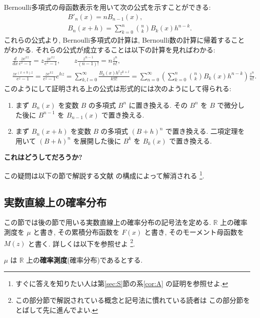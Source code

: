 \documentclass[12pt,twoside]{jarticle}
\newcommand\BF{\bfseries}
\newcommand\R{{\mathbb R}} %
\theoremstyle{jplain}
\theoremstyle{jplain}
\theoremstyle{jplain}
\numberwithin{theorem}{section}
\numberwithin{equation}{section}
\numberwithin{figure}{section}
\numberwithin{table}{section}
\newcommand\secref[1]{第\ref{#1}節}
\newcommand\corref[1]{系\ref{#1}}
\begin{document}
Bernoulli多項式の母函数表示を用いて次の公式を示すことができる:
\begin{align*}
& B'_n(x) = n B_{n-1}(x), \\
& B_n(x+h) = \sum_{k=0}^n \binom{n}{k} B_k(x)h^{n-k}.
\end{align*}
これらの公式より, Bernoulli多項式の計算は,
Bernoulli数の計算に帰着することがわかる.
それらの公式が成立することは以下の計算を見ればわかる:
\begin{align*}
  &
  \frac{d}{dx}\frac{ze^{xz}}{e^z-1}=z\frac{ze^{xz}}{e^z-1},
  \qquad
  z\frac{z^{n-1}}{(n-1)!} = n\frac{z^n}{n!},
  \\ &
  \frac{ze^{(x+h)z}}{e^z-1}=\frac{ze^{xz}}{e^z-1}e^{hz}
  =\sum_{k,l=0}^\infty \frac{B_k(x)h^l z^{k+l}}{k!l!}
  =\sum_{n=0}^\infty
  \left(\sum_{k=0}^n\binom{n}{k}B_k(x)h^{n-k}\right)
  \frac{z^n}{n!}.
\end{align*}
このようにして証明される上の公式は形式的には次のようにして得られる:
\begin{enumerate}
  \item まず $B_n(x)$ を変数 $B$ の多項式 $B^n$ に置き換える.
  その $B^n$ を $B$ で微分した後に $B^{n-1}$ を $B_{n-1}(x)$ で置き換える.
  \item まず $B_n(x+h)$ を変数 $B$ の多項式 $(B+h)^n$ で置き換える.
  二項定理を用いて $(B+h)^n$ を展開した後に $B^k$ を $B_k(x)$ で置き換える.
\end{enumerate}

{\BF これはどうしてだろうか?}

この疑問は以下の節で解説する文献 \cite{BCM2009} の構成によって解消される%
\footnote{すぐに答えを知りたい人は\secref{sec:S}の\corref{cor:A}
の証明を参照せよ.}.


\subsection{実数直線上の確率分布}
\label{sec:mu}

この節では後の節で用いる実数直線上の確率分布の記号法を定める.
$\R$ 上の確率測度を $\mu$ と書き, その累積分布函数を $F(x)$ と書き,
そのモーメント母函数を $M(z)$ と書く.
詳しくは以下を参照せよ%
\footnote{この部分節で解説されている概念と記号法に慣れている読者は
この部分節をとばして先に進んでよい.}.

$\mu$ は $\R$ 上の{\BF 確率測度}(確率分布)であるとする.
\end{document}
